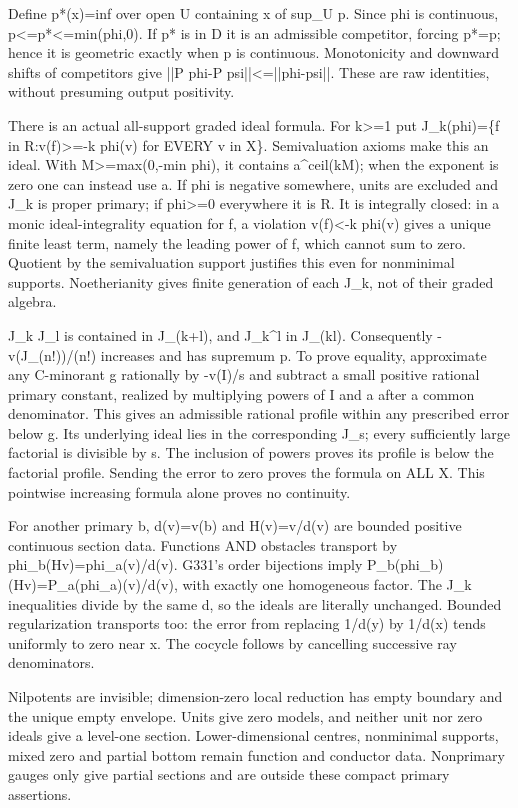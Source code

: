 \documentclass[11pt]{article}
\begin{document}
Define p*(x)=inf over open U containing x of sup\_U p. Since phi is continuous, p<=p*<=min(phi,0). If p* is in D it is an admissible competitor, forcing p*=p; hence it is geometric exactly when p is continuous. Monotonicity and downward shifts of competitors give ||P phi-P psi||<=||phi-psi||. These are raw identities, without presuming output positivity.

There is an actual all-support graded ideal formula. For k>=1 put J\_k(phi)=\{f in R:v(f)>=-k phi(v) for EVERY v in X\}. Semivaluation axioms make this an ideal. With M>=max(0,-min phi), it contains a\textasciicircum{}ceil(kM); when the exponent is zero one can instead use a. If phi is negative somewhere, units are excluded and J\_k is proper primary; if phi>=0 everywhere it is R. It is integrally closed: in a monic ideal-integrality equation for f, a violation v(f)<-k phi(v) gives a unique finite least term, namely the leading power of f, which cannot sum to zero. Quotient by the semivaluation support justifies this even for nonminimal supports. Noetherianity gives finite generation of each J\_k, not of their graded algebra.

J\_k J\_l is contained in J\_(k+l), and J\_k\textasciicircum{}l in J\_(kl). Consequently -v(J\_(n!))/(n!) increases and has supremum p. To prove equality, approximate any C-minorant g rationally by -v(I)/s and subtract a small positive rational primary constant, realized by multiplying powers of I and a after a common denominator. This gives an admissible rational profile within any prescribed error below g. Its underlying ideal lies in the corresponding J\_s; every sufficiently large factorial is divisible by s. The inclusion of powers proves its profile is below the factorial profile. Sending the error to zero proves the formula on ALL X. This pointwise increasing formula alone proves no continuity.

For another primary b, d(v)=v(b) and H(v)=v/d(v) are bounded positive continuous section data. Functions AND obstacles transport by phi\_b(Hv)=phi\_a(v)/d(v). G331's order bijections imply P\_b(phi\_b)(Hv)=P\_a(phi\_a)(v)/d(v), with exactly one homogeneous factor. The J\_k inequalities divide by the same d, so the ideals are literally unchanged. Bounded regularization transports too: the error from replacing 1/d(y) by 1/d(x) tends uniformly to zero near x. The cocycle follows by cancelling successive ray denominators.

Nilpotents are invisible; dimension-zero local reduction has empty boundary and the unique empty envelope. Units give zero models, and neither unit nor zero ideals give a level-one section. Lower-dimensional centres, nonminimal supports, mixed zero and partial bottom remain function and conductor data. Nonprimary gauges only give partial sections and are outside these compact primary assertions.
\end{document}

